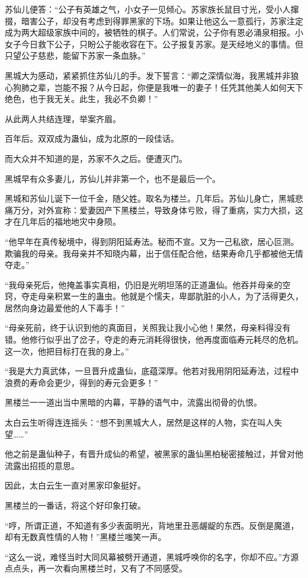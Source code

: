 \begin{this_body}
苏仙儿便答：“公子有英雄之气，小女子一见倾心。苏家族长鼠目寸光，受小人撺掇，暗害公子，却没有考虑到得罪黑家的下场。如果让他这么一意孤行，苏家注定成为两大超级家族中间的，被牺牲的棋子。人们常说，公子你有恩必涌泉相报。小女子今日救下公子，只盼公子能收容在下。公子报复苏家。是天经地义的事情。但只望公子慈悲，能留下苏家一条血脉。”

黑城大为感动，紧紧抓住苏仙儿的手。发下誓言：“卿之深情似海，我黑城并非狼心狗肺之辈，岂能不报？从今日起，你便是我唯一的妻子！任凭其他美人如何天下绝色，也于我无关。此生，我必不负卿！”

从此两人共结连理，举案齐眉。

百年后。双双成为蛊仙，成为北原的一段佳话。

而大众并不知道的是，苏家不久之后。便遭灭门。

黑城早有众多妻儿，苏仙儿并非第一个，也不是最后一个。

黑城和苏仙儿诞下一位千金，随父姓。取名为楼兰。几年后。苏仙儿身亡，黑城悲痛万分，对外宣称：爱妻因产下黑楼兰，导致身体亏败，得了重病，实力大损，这才在几年后的福地地灾中身陨。

“他早年在真传秘境中，得到阴阳延寿法。秘而不宣。又为一己私欲，居心叵测。欺骗我的母亲。我母亲并不知晓内幕，出于信任配合他，结果寿命几乎都被他无情夺走。”

“我母亲死后，他掩盖事实真相，仍旧是光明坦荡的正道蛊仙。他吞并母亲的空窍，夺走母亲积累一生的蛊虫。他就是个懦夫，卑鄙肮脏的小人，为了活得更久，居然向身边最爱他的人下毒手！”

“母亲死前，终于认识到他的真面目，关照我让我小心他！果然，母亲料得没有错。他修行似乎出了岔子，夺走的寿元消耗得很快，他再度面临寿元耗尽的危机。这一次，他把目标打在我的身上。”

“我是大力真武体，一旦晋升成蛊仙，底蕴深厚。他若对我用阴阳延寿法，过程中浪费的寿命会更少，得到的寿元会更多！”

黑楼兰一一道出当中黑暗的内幕，平静的语气中，流露出彻骨的仇恨。

太白云生听得连连摇头：“想不到黑城大人，居然是这样的人物，实在叫人失望……”

他之前是蛊仙种子，有晋升成仙的希望，被黑家的蛊仙黑柏秘密接触过，并曾对他流露出招揽的意思。

因此，太白云生一直对黑家印象挺好。

黑楼兰的一番话，将这个好印象打破。

“哼，所谓正道，不知道有多少表面明光，背地里丑恶龌龊的东西。反倒是魔道，却有无数真性情的人物！”黑楼兰嗤笑一声。

“这么一说，难怪当时大同风幕被劈开通道，黑城呼唤你的名字，你却不应。”方源点点头，再一次看向黑楼兰时，又有了不同感受。


\end{this_body}
